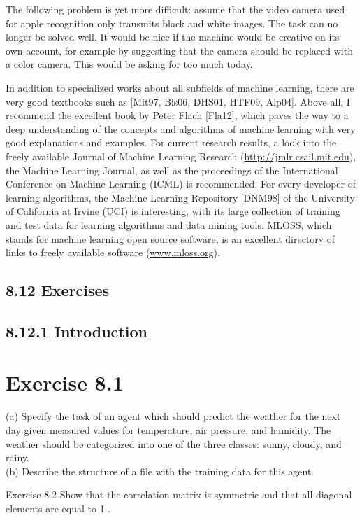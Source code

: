 \documentclass[10pt]{book}
\begin{document}
\begin{center}
\begin{enumerate}
\begin{center}
\begin{center}
\begin{center}
The following problem is yet more difficult: assume that the video camera used for apple recognition only transmits black and white images. The task can no longer be solved well. It would be nice if the machine would be creative on its own account, for example by suggesting that the camera should be replaced with a color camera. This would be asking for too much today.

In addition to specialized works about all subfields of machine learning, there are very good textbooks such as [Mit97, Bis06, DHS01, HTF09, Alp04]. Above all, I recommend the excellent book by Peter Flach [Fla12], which paves the way to a deep understanding of the concepts and algorithms of machine learning with very good explanations and examples. For current research results, a look into the freely available Journal of Machine Learning Research (\href{http://jmlr.csail.mit.edu}{http://jmlr.csail.mit.edu}), the Machine Learning Journal, as well as the proceedings of the International Conference on Machine Learning (ICML) is recommended. For every developer of learning algorithms, the Machine Learning Repository [DNM98] of the University of California at Irvine (UCI) is interesting, with its large collection of training and test data for learning algorithms and data mining tools. MLOSS, which stands for machine learning open source software, is an excellent directory of links to freely available software (\href{http://www.mloss.org}{www.mloss.org}).

\subsection*{8.12 Exercises}
\subsection*{8.12.1 Introduction}
\section*{Exercise 8.1}
(a) Specify the task of an agent which should predict the weather for the next day given measured values for temperature, air pressure, and humidity. The weather should be categorized into one of the three classes: sunny, cloudy, and rainy.\\
(b) Describe the structure of a file with the training data for this agent.

Exercise 8.2 Show that the correlation matrix is symmetric and that all diagonal elements are equal to 1 .


\end{center}
\end{center}
\end{center}
\end{enumerate}
\end{center}
\end{document}
